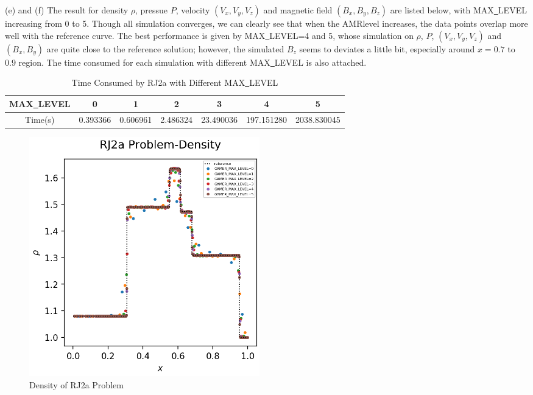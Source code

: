 \documentclass[a4paper,10pt]{article}
\begin{document}
\setlength{\parindent}{0em}(e) and (f) The result for density $\rho$, pressue $P$, velocity $(V_x, V_y, V_z)$ and  magnetic field $(B_x, B_y, B_z)$ are listed below, with MAX\underline{\ }LEVEL increasing from 0 to 5. Though all simulation converges, we can clearly see that when the AMRlevel increases, the data points overlap more well with the reference curve. The best performance is given by MAX\underline{\ }LEVEL=4 and 5, whose simulation on $\rho$, $P$, $(V_x, V_y, V_z)$ and $(B_x, B_y)$ are quite close to the reference solution; however, the simulated $B_z$ seems to deviates a little bit, especially around $x=0.7$ to $0.9$ region. The time consumed for each simulation with different MAX\underline{\ }LEVEL is also attached.

\begin{table}[h]  %
\centering  %
\begin{tabular}[t]{|c|c|c|c|c|c|c|}
\hline
MAX\underline{\ }LEVEL & 0 & 1 & 2 & 3 &4 &5 \\
\hline
Time(s)  & 0.393366 & 0.606961 & 2.486324  & 23.490036 & 197.151280 & 2038.830045 \\
\hline
\end{tabular}
\caption{Time Consumed by RJ2a with Different MAX\underline{\ }LEVEL}  %
\end{table}

\begin{figure}[htbp] %
\centering %
\includegraphics[width=10cm]{density_2.png} %
\caption{Density of RJ2a Problem}
\end{figure}
\end{document}
